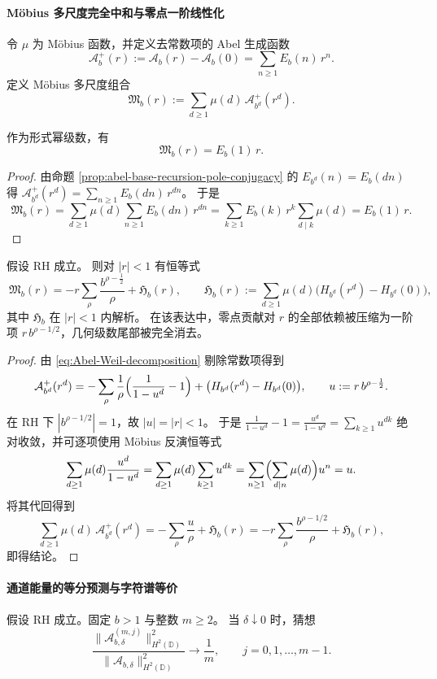 \paragraph{Möbius 多尺度完全中和与零点一阶线性化}
令 \(\mu\) 为 Möbius 函数，并定义去常数项的 Abel 生成函数
\[
\mathcal A_b^+(r):=\mathcal A_b(r)-\mathcal A_b(0)=\sum_{n\ge 1}E_b(n)\,r^n.
\]
定义 Möbius 多尺度组合
\[
\boxed{\ \mathfrak M_b(r):=\sum_{d\ge 1}\mu(d)\,\mathcal A_{b^d}^+(r^d).\ }
\]

\begin{proposition}[完全中和的形式恒等式]\label{prop:abel-mobius-neutralization-formal}
作为形式幂级数，有
\[
\boxed{\ \mathfrak M_b(r)=E_b(1)\,r.\ }
\]
\end{proposition}
\begin{proof}
由命题 \ref{prop:abel-base-recursion-pole-conjugacy} 的 \(E_{b^d}(n)=E_b(dn)\) 得
\(
\mathcal A_{b^d}^+(r^d)=\sum_{n\ge 1}E_b(dn)\,r^{dn}
\)。
于是
\[
\mathfrak M_b(r)
=\sum_{d\ge 1}\mu(d)\sum_{n\ge 1}E_b(dn)\,r^{dn}
=\sum_{k\ge 1}E_b(k)\,r^k\sum_{d\mid k}\mu(d)
=E_b(1)\,r.
\]
\end{proof}

\begin{theorem}[RH 下的零点几何尾项线性化]\label{thm:abel-mobius-linearization}
假设 RH 成立。
则对 \(|r|<1\) 有恒等式
\[
\boxed{\ \mathfrak M_b(r)
=-r\sum_{\rho}\frac{b^{\rho-\frac12}}{\rho}+\mathfrak H_b(r),
\qquad
\mathfrak H_b(r):=\sum_{d\ge 1}\mu(d)\bigl(H_{b^d}(r^d)-H_{b^d}(0)\bigr),\ }
\]
其中 \(\mathfrak H_b\) 在 \(|r|<1\) 内解析。
在该表达中，零点贡献对 \(r\) 的全部依赖被压缩为一阶项 \(r\,b^{\rho-1/2}\)，几何级数尾部被完全消去。
\end{theorem}
\begin{proof}
由 \eqref{eq:Abel-Weil-decomposition} 剔除常数项得到
\[
\mathcal A_{b^d}^+(r^d)
=-\sum_{\rho}\frac{1}{\rho}\Bigl(\frac{1}{1-u^d}-1\Bigr)+\bigl(H_{b^d}(r^d)-H_{b^d}(0)\bigr),
\qquad u:=r\,b^{\rho-\frac12}.
\]
在 RH 下 \(|b^{\rho-1/2}|=1\)，故 \(|u|=|r|<1\)。
于是
\(
\frac{1}{1-u^d}-1=\frac{u^d}{1-u^d}=\sum_{k\ge 1}u^{dk}
\)
绝对收敛，并可逐项使用 Möbius 反演恒等式
\[
\sum_{d\ge 1}\mu(d)\frac{u^d}{1-u^d}
=\sum_{d\ge 1}\mu(d)\sum_{k\ge 1}u^{dk}
=\sum_{n\ge 1}\Bigl(\sum_{d\mid n}\mu(d)\Bigr)u^n
=u.
\]
将其代回得到
\[
\sum_{d\ge 1}\mu(d)\,\mathcal A_{b^d}^+(r^d)
=-\sum_{\rho}\frac{u}{\rho}+\mathfrak H_b(r)
=-r\sum_{\rho}\frac{b^{\rho-1/2}}{\rho}+\mathfrak H_b(r),
\]
即得结论。
\end{proof}

\paragraph{通道能量的等分预测与字符谱等价}
\begin{conjecture}[对数尺度粗化下的通道能量等分]\label{conj:abel-channel-energy-equipartition}
假设 RH 成立。固定 \(b>1\) 与整数 \(m\ge 2\)。
当 \(\delta\downarrow 0\) 时，猜想
\[
\boxed{\ \frac{\|\mathcal A_{b,\delta}^{(m,j)}\|_{H^2(\mathbb D)}^2}{\|\mathcal A_{b,\delta}\|_{H^2(\mathbb D)}^2}\longrightarrow \frac1m,
\qquad j=0,1,\dots,m-1.\ }
\]
\end{conjecture}


